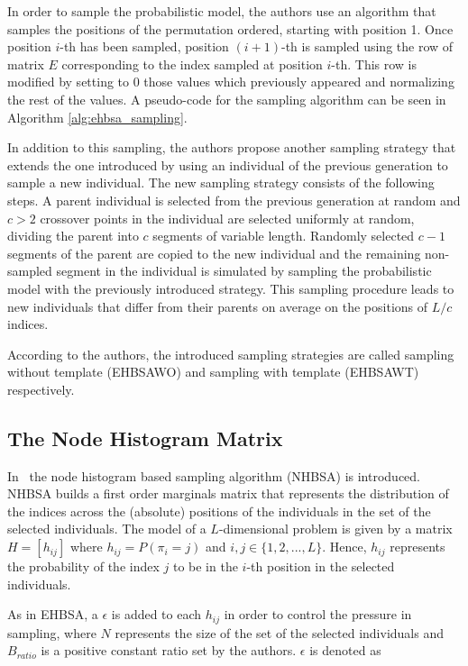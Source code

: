 In order to sample the probabilistic model, the authors use an algorithm that samples the positions of the permutation ordered, starting with position 1. Once position $i$-th has been sampled, position $(i+1)$-th is sampled using the row of matrix $E$ corresponding to the index sampled at position $i$-th. This row is modified by setting to $0$ those values which previously appeared and normalizing the rest of the values. A pseudo-code for the sampling algorithm can be seen in Algorithm \ref{alg:ehbsa_sampling}.

In addition to this sampling, the authors propose another sampling strategy that extends the one introduced by using an individual of the previous generation to sample a new individual. The new sampling strategy consists of the following steps. A parent individual is selected from the previous generation at random and $c>2$ crossover points in the individual are selected uniformly at random, dividing the parent into $c$ segments of variable length. Randomly selected $c-1$ segments of the parent are copied to the new individual and the remaining non-sampled segment in the individual is simulated by sampling the probabilistic model with the previously introduced strategy. This sampling procedure leads to new individuals that differ from their parents on average on the positions of $L/c$ indices.

According to the authors, the introduced sampling strategies are called sampling without template (EHBSAWO) and sampling with template (EHBSAWT) respectively. 



\subsection{The Node Histogram Matrix}
In~\citep{tsutsui2006node} the node histogram based sampling algorithm (NHBSA) is introduced. NHBSA builds a first order marginals matrix that represents the distribution of the indices across the (absolute) positions of the individuals in the set of the selected individuals. The model of a $L$-dimensional problem is given by a matrix $H=[h_{ij}]$ where $h_{ij} =P(\pi_i =j)$ and $i, j \in \{1,2,...,L\}$. Hence, $h_{ij}$ represents the probability of the index $j$ to be in the $i$-th position in the selected individuals.

As in EHBSA, a $\epsilon$ is added to each $h_{ij}$ in order to control the pressure in sampling, where $N$ represents the size of the set of the selected individuals and
$B_{ratio}$ is a positive constant ratio set by the authors. $\epsilon$ is denoted as


